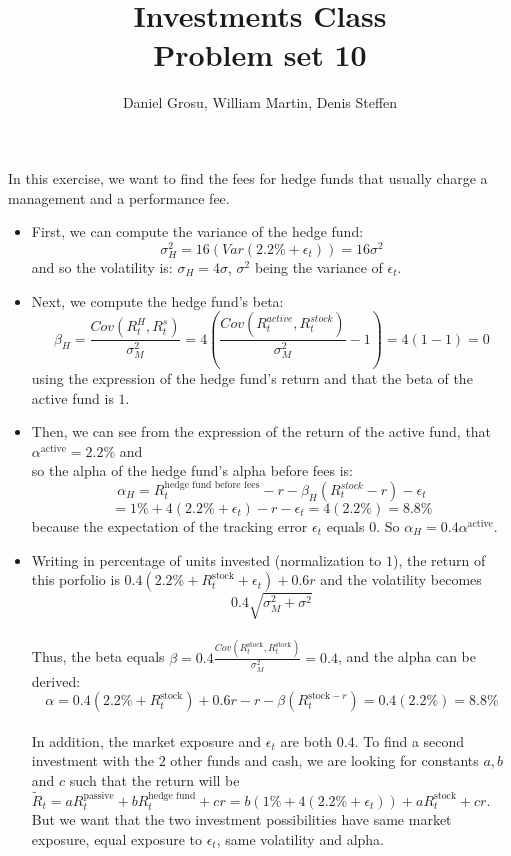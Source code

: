 \documentclass[10pt]{article}
\newenvironment{exercise}[2][Exercise]{\begin{trivlist}
  \item[\hskip \labelsep {\bfseries #1}\hskip \labelsep {\bfseries #2.}]}{\end{trivlist}}
\begin{document}
  \pagecolor{solar}
	
  \renewcommand{\qedsymbol}{\smiley}
	\title{Investments Class \\ Problem set 10}
	\author{Daniel Grosu, William Martin, Denis Steffen}
		
\maketitle

\begin{exercise}{1. Fund performance and fees}
	In this exercise, we want to find the fees for hedge funds that usually charge a management and a performance fee. 
	\begin{itemize}
		\item[a)] First, we can compute the variance of the hedge fund: $$ \sigma_H^2 = 16 (Var(2.2\% + \epsilon_t)) = 16 \sigma^2 $$ and so the volatility is: $\sigma_H = 4\sigma$, $\sigma^2$ being the variance of $\epsilon_t$.
		\item[b)] Next, we compute the hedge fund's beta: 
		$$ \beta_H = \frac{Cov(R_t^H,R_t^s)}{\sigma_M^2} = 4(\frac{Cov(R_t^{active},R_t^{stock})}{\sigma_M^2} - 1) = 4(1-1) = 0$$ using the expression of the hedge fund's return and that the beta of the active fund is $1$.
		\item[c)] Then, we can see from the expression of the return of the active fund, that $\alpha^{\text{active}} = 2.2\%$ and \\ 
		so the alpha of the hedge fund's alpha before fees is: $$ \alpha_H = R_t^{\text{hedge fund before fees}} - r - \beta_H(R_t^{stock}- r) - \epsilon_t $$ $$= 1\% + 4(2.2\% + \epsilon_t) -r - \epsilon_t = 4(2.2\%) = 8.8\%$$ because the expectation of the tracking error $\epsilon_t$ equals $0$. So $\alpha_H = 0.4\alpha^{\text{active}}$.
		\item[d)] Writing in percentage of units invested (normalization to $1$), the return of this porfolio is $ 0.4(2.2\% + R_t^{\text{stock}} + \epsilon_t) + 0.6r$ and the volatility becomes $$0.4\sqrt{\sigma_M^2 + \sigma^2}$$ \\
		Thus, the beta equals $\beta = 0.4\frac{Cov(R_t^{\text{stock}},R_t^{\text{stock}})}{\sigma_M^2} = 0.4$, and the alpha can be derived: $$ \alpha = 0.4(2.2\% + R_t^{\text{stock}}) + 0.6r -r - \beta(R_t^{\text{stock}- r}) = 0.4(2.2\%) = 8.8\%$$
		\\
		In addition, the market exposure and $\epsilon_t$ are both $0.4$. To find a second investment with the $2$ other funds and cash, we are looking for constants $a,b $ and $c$ such that the return will be $\tilde{R}_t = aR_t^{\text{passive}} + bR_t^{\text{hedge fund}} + cr = b(1\% + 4(2.2\% + \epsilon_t)) + aR_t^{\text{stock}} + cr$. But we want that the two investment possibilities have same market exposure, equal exposure to $\epsilon_t$, same volatility and alpha. 


\end{itemize}
\end{exercise}
\end{document}
